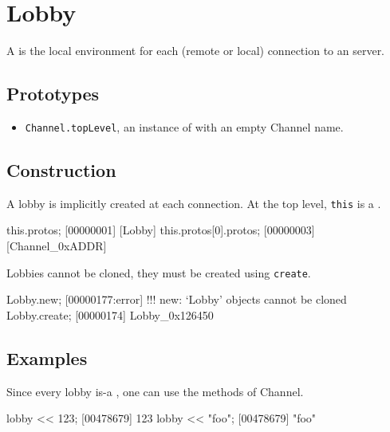 \section{Lobby}

A  is the local environment for each (remote or local)
connection to an \urbi server.

\subsection{Prototypes}
\begin{itemize}
\item \lstinline|Channel.topLevel|, an instance of 
  with an empty Channel name.
\end{itemize}

\subsection{Construction}

A lobby is implicitly created at each connection. At the top level,
\lstinline|this| is a .

\begin{urbiscript}
this.protos;
[00000001] [Lobby]
this.protos[0].protos;
[00000003] [Channel_0xADDR]
\end{urbiscript}

Lobbies cannot be cloned, they must be created using
\lstinline|create|.

\begin{urbiscript}
Lobby.new;
[00000177:error] !!! new: `Lobby' objects cannot be cloned
Lobby.create;
[00000174] Lobby_0x126450
\end{urbiscript}


\subsection{Examples}

Since every lobby is-a , one can use the methods of
Channel.

\begin{urbiscript}
lobby << 123;
[00478679] 123
lobby << "foo";
[00478679] "foo"
\end{urbiscript}

